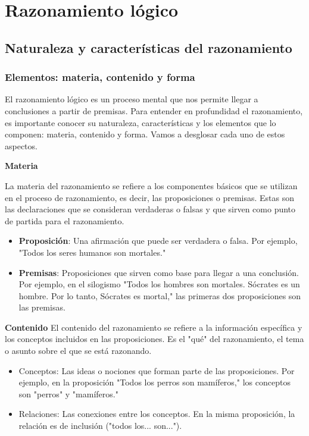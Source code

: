 \section{Razonamiento lógico}

\subsection{Naturaleza y características del razonamiento}
\subsubsection{Elementos: materia, contenido y forma}

El razonamiento lógico es un proceso mental que nos permite llegar a conclusiones a partir de premisas. Para entender en profundidad el razonamiento, es importante conocer su naturaleza, características y los elementos que lo componen: materia, contenido y forma. Vamos a desglosar cada uno de estos aspectos.

\textbf{Materia}

La materia del razonamiento se refiere a los componentes básicos que se utilizan en el proceso de razonamiento, es decir, las proposiciones o premisas. Estas son las declaraciones que se consideran verdaderas o falsas y que sirven como punto de partida para el razonamiento.

\begin{itemize}
   \item \textbf{Proposición}: Una afirmación que puede ser verdadera o falsa. Por ejemplo, "Todos los seres humanos son mortales."
   \item \textbf{Premisas}: Proposiciones que sirven como base para llegar a una conclusión. Por ejemplo, en el silogismo "Todos los hombres son mortales. Sócrates es un hombre. Por lo tanto, Sócrates es mortal," las primeras dos proposiciones son las premisas.
\end{itemize}

\textbf{Contenido}
El contenido del razonamiento se refiere a la información específica y los conceptos incluidos en las proposiciones. Es el "qué" del razonamiento, el tema o asunto sobre el que se está razonando.

\begin{itemize}
   \item Conceptos: Las ideas o nociones que forman parte de las proposiciones. Por ejemplo, en la proposición "Todos los perros son mamíferos," los conceptos son "perros" y "mamíferos."
   \item Relaciones: Las conexiones entre los conceptos. En la misma proposición, la relación es de inclusión ("todos los... son...").
\end{itemize}

